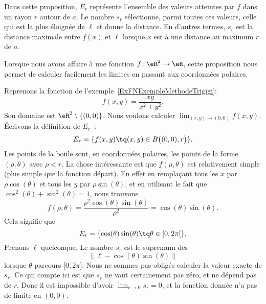 Dans cette proposition, \( E_r\) représente l'ensemble des valeurs atteintes par \( f\) dans un rayon \( r\) autour de \( a\). Le nombre \( s_r\) sélectionne, parmi toutes ces valeurs, celle qui est la plus éloignée de \( \ell\) et donne la distance. En d'autres termes, \( s_r\) est la distance maximale entre \( f(x)\) et \( \ell\) lorsque \( x\) est à une distance au maximum \( r\) de \( a\).

Lorsque nous avons affaire à une fonction \( f\colon \eR^2\to \eR\), cette proposition nous permet de calculer facilement les limites en passant aux coordonnées polaires.

\begin{example}		\label{ExempleMethodeTrigigi}
	Reprenons la fonction de l'exemple~\ref{ExFNExempleMethodeTrigigi}:
	\begin{equation}
		f(x,y)=\frac{ xy }{ x^2+y^2 }.
	\end{equation}
	Son domaine est \( \eR^2\setminus\{ (0,0) \}\). Nous voulons calculer \( \lim_{(x,y)\to(0,0)}f(x,y)\). Écrivons la définition de \( E_r\)~:
	\begin{equation}
		E_r=\{ f(x,y)\tq (x,y)\in B\big( (0,0),r \big) \}.
	\end{equation}
	Les points de la boule sont, en coordonnées polaires, les points de la forme \( (\rho,\theta)\) avec \( \rho<r\). La chose intéressante est que \( f(\rho,\theta)\) est relativement simple (plus simple que la fonction départ). En effet en remplaçant tous les \( x\) par \( \rho\cos(\theta)\) et tous les \( y\) par \( \rho\sin(\theta)\), et en utilisant le fait que \( \cos^2(\theta)+\sin^2(\theta)=1\), nous trouvons
	\begin{equation}		\label{Eq2807fpolairerhodeuxcossin}
		f(\rho,\theta)=\frac{ \rho^2\cos(\theta)\sin(\theta) }{ \rho^2 }=\cos(\theta)\sin(\theta).
	\end{equation}
	Cela signifie que
	\begin{equation}
		E_r=\{ \cos(\theta)\sin(\theta)\tq\theta\in\mathopen[ 0 , 2\pi [ \}.
	\end{equation}
	Prenons \( \ell\) quelconque. Le nombre \( s_r\) est le supremum des
	\begin{equation}
		\| \ell-\cos(\theta)\sin(\theta) \|
	\end{equation}
	lorsque \( \theta\) parcours \( \mathopen[ 0 , 2\pi \mathclose]\). Nous ne sommes pas obligés calculer la valeur exacte de \( s_r\). Ce qui compte ici est que \( s_r\) ne vaut certainement pas zéro, et ne dépend pas de \( r\). Donc il est impossible d'avoir \( \lim_{r\to 0} s_r=0\), et la fonction donnée n'a pas de limite en \( (0,0)\).
\end{example}

